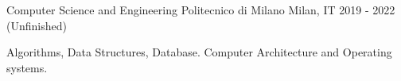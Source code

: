 

\begin{cventries}

  \cventry
    {Computer Science and Engineering} %
    {Politecnico di Milano} %
    {Milan, IT} %
    {2019 - 2022 (Unfinished)} %
    {
      \begin{cvitems} %
        \item {Algorithms, Data Structures, Database. Computer Architecture and Operating systems.}
      \end{cvitems}
    }
    

\end{cventries}
